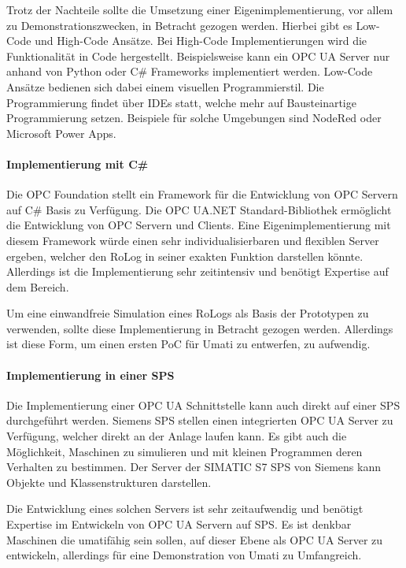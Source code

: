 \documentclass[a4paper, 12pt, oneside, toc=listofnumbered, bibliography=totoc]{scrbook}
\begin{document}
			Trotz der Nachteile sollte die Umsetzung einer Eigenimplementierung, vor allem zu Demonstrationszwecken, in Betracht gezogen werden. Hierbei gibt es Low-Code und High-Code Ansätze. Bei High-Code Implementierungen wird die Funktionalität in Code hergestellt. Beispielsweise kann ein OPC UA Server nur anhand von Python oder C\# Frameworks implementiert werden. Low-Code Ansätze bedienen sich dabei einem visuellen Programmierstil. Die Programmierung findet über IDEs statt, welche mehr auf Bausteinartige Programmierung setzen. Beispiele für solche Umgebungen sind NodeRed oder Microsoft Power Apps. 
			
			\paragraph{Implementierung mit C\#}
			Die OPC Foundation stellt ein Framework für die Entwicklung von OPC Servern auf C\# Basis zu Verfügung. Die OPC UA.NET Standard-Bibliothek ermöglicht die Entwicklung von OPC Servern und Clients. Eine Eigenimplementierung mit diesem Framework würde einen sehr individualisierbaren und flexiblen Server ergeben, welcher den RoLog in seiner exakten Funktion darstellen könnte. Allerdings ist die Implementierung sehr zeitintensiv und benötigt Expertise auf dem Bereich.\cite{noauthor_opc_nodate-1}
			
			Um eine einwandfreie Simulation eines RoLogs als Basis der Prototypen zu verwenden, sollte diese Implementierung in Betracht gezogen werden. Allerdings ist diese Form, um einen ersten \ac{PoC} für Umati zu entwerfen, zu aufwendig.
			
			\paragraph{Implementierung in einer SPS}
			Die Implementierung einer OPC UA Schnittstelle kann auch direkt auf einer SPS durchgeführt werden. Siemens SPS stellen einen integrierten OPC UA Server zu Verfügung, welcher direkt an der Anlage laufen kann. Es gibt auch die Möglichkeit, Maschinen zu simulieren und mit kleinen Programmen deren Verhalten zu bestimmen. Der Server der SIMATIC S7 SPS von Siemens kann Objekte und Klassenstrukturen darstellen. \cite{noauthor_tia_2019}
			
			Die Entwicklung eines solchen Servers ist sehr zeitaufwendig und benötigt Expertise im Entwickeln von OPC UA Servern auf SPS. Es ist denkbar Maschinen die umatifähig sein sollen, auf dieser Ebene als OPC UA Server zu entwickeln, allerdings für eine Demonstration von Umati zu Umfangreich.
			
\end{document}
